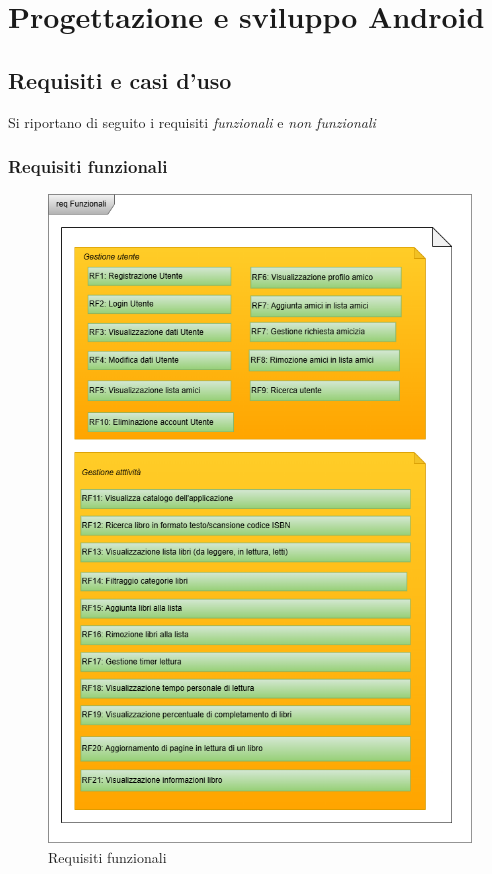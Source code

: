 \documentclass{article}
\begin{document}
\section{Progettazione e sviluppo Android}

\subsection{Requisiti e casi d'uso}
Si riportano di seguito i requisiti \textit{funzionali} e \textit{non funzionali}
\subsubsection{Requisiti funzionali}

\begin{figure}[H]
  \centering
  \includegraphics[width=.9\linewidth]{req_funzionali.png}
  \caption{Requisiti funzionali}
  \label{fig:sitemap}
\end{figure}
\end{document}
